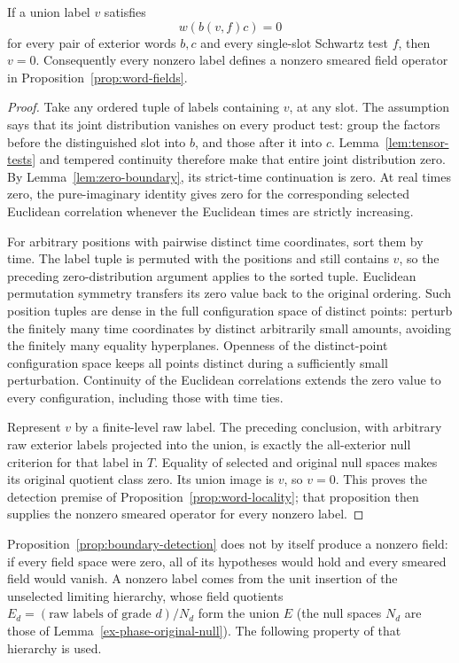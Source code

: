\begin{proposition}\label{prop:boundary-detection}
If a union label $v$ satisfies
\[
 w(b(v,f)c)=0
\]
for every pair of exterior words $b,c$ and every single-slot Schwartz test
$f$, then $v=0$. Consequently every nonzero label defines a nonzero smeared
field operator in Proposition~\ref{prop:word-fields}.
\end{proposition}
\begin{proof}
Take any ordered tuple of labels containing $v$, at any slot. The
assumption says that its joint distribution vanishes on every product
test: group the factors before the distinguished slot into $b$, and those
after it into $c$. Lemma~\ref{lem:tensor-tests} and tempered continuity
therefore make that entire joint distribution zero. By
Lemma~\ref{lem:zero-boundary}, its strict-time continuation is zero.
At real times zero, the pure-imaginary identity gives zero for the
corresponding selected Euclidean correlation whenever the Euclidean times
are strictly increasing.

For arbitrary positions with pairwise distinct time coordinates, sort
them by time. The label tuple is permuted with the positions and still
contains $v$, so the preceding zero-distribution argument applies to the
sorted tuple. Euclidean permutation symmetry transfers its zero value
back to the original ordering. Such position tuples are dense in the
full configuration space of distinct points: perturb the finitely many
time coordinates by distinct arbitrarily small amounts, avoiding the
finitely many equality hyperplanes. Openness of the distinct-point
configuration space keeps all points distinct during a sufficiently small
perturbation. Continuity of the Euclidean correlations extends the zero
value to every configuration, including those with time ties.

Represent $v$ by a finite-level raw label. The preceding conclusion,
with arbitrary raw exterior labels projected into the union, is exactly
the all-exterior null criterion for that label in $T$. Equality of selected
and original null spaces makes its original quotient class zero. Its
union image is $v$, so $v=0$. This proves the detection premise of
Proposition~\ref{prop:word-locality}; that proposition then supplies the
nonzero smeared operator for every nonzero label.
\end{proof}

Proposition~\ref{prop:boundary-detection} does not by itself produce a
nonzero field: if every field space were zero, all of its hypotheses would
hold and every smeared field would vanish. A nonzero label comes from the
unit insertion of the unselected limiting hierarchy, whose field quotients
$E_d=(\text{raw labels of grade }d)/N_d$ form the union $E$ (the null
spaces $N_d$ are those of Lemma~\ref{ex-phase-original-null}). The
following property of that hierarchy is used.

